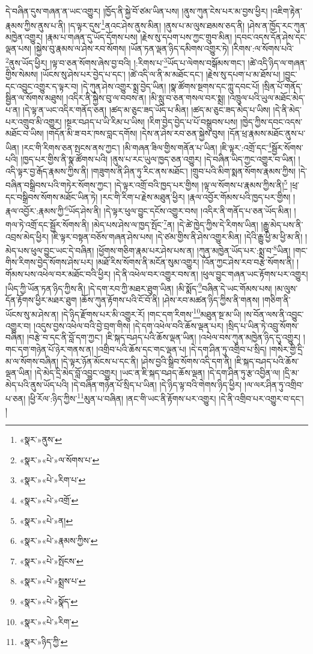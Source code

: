 དེ་བཞིན་དུས་གཞན་ན་ཡང་འགྱུར། །ཁྱོད་ནི་སྐྱེ་བོ་ཙམ་ཡིན་པས། །ནུས་ཀུན་ངེས་པར་མ་བྱས་ཕྱིར། །འཇིག་རྟེན་རྣམས་ཀྱིས་ནུས་པ་ནི། །ད་ལྟར་དུས་\footnote{«སྣར་»ནུས་}ནའང་ཤེས་ནུས་མིན། །ནུས་པ་མ་ལུས་ཐམས་ཅད་ནི། །ཤེས་ན་ཁྱོད་རང་ཀུན་མཁྱེན་འགྱུར། །རྣམ་པ་གཞན་དུ་ཡོད་དོགས་པས། །རྗེས་སུ་དཔག་པས་ཀྱང་གྲུབ་མིན། །དབང་འདས་དོན་ཤེས་དང་ལྡན་པས། །སྐྱེས་བུ་རྣམས་ལ་ཤེས་རབ་སོགས། །ཡོན་ཏན་ལྡན་ཉིད་དམིགས་འགྱུར་ཏེ། །རིགས་:ལ་སོགས་པའི་\footnote{«སྣར་»«པེ་»ལ་སོགས་པ་}ནུས་ཡོད་ཕྱིར། །ལྟ་བ་ཅན་སོགས་ཞེས་བྱ་བའི། །:རིགས་པ་\footnote{«སྣར་»«པེ་»རིག་པ་}ཡོད་པ་ལེགས་བསྒོམས་གང་། །ཚེ་འདི་ཉིད་ལ་གཞན་གྱིས་སེམས། །ཡོངས་སུ་ཤེས་པར་བྱེད་པ་དང་། །ཚེ་འདི་ལ་ནི་མ་མཐོང་དང་། །རྗེས་སུ་དཔག་པ་མ་ཐོས་པ། །བྱུང་དང་འབྱུང་འགྱུར་ད་ལྟར་བ། །དེ་ཀུན་ཤེས་འགྱུར་སྨྲ་བྱེད་ཡིན། །སྣ་ཚོགས་སྔགས་དང་ཀླུ་དབང་པོ། །སྲིན་པོ་གནོད་སྦྱིན་ལ་སོགས་མཐུས། །འདིར་ནི་སྐྱེས་བུ་ལ་བབས་ན། །མི་སླུ་བ་ཅན་གསལ་བར་སྨྲ། །འཁྲུལ་པའི་ཡུལ་མཐོང་མེད་པ་ན། །དེ་ལྟ་ན་ཡང་འདིར་གནོད་ཅན། །ཚད་མ་ཅུང་ཟད་ཡོད་པ་མིན། །ཚད་མ་ཅུང་ཟད་མེད་པ་ཡིས། །དེ་ནི་མེད་པར་འགྲུབ་མི་འགྱུར། །སྔར་བཤད་པ་ཡི་རིམ་པ་ཡིས། །རིག་བྱེད་བྱེད་པ་པོ་བསྒྲུབས་པས། །ཁྱེད་ཀྱིས་དབང་འདས་མཐོང་བ་ཡིས། །གདོན་མི་ཟ་བར་ཁས་བླང་དགོས། །དེས་ན་ཤེས་རབ་ཅན་སྐྱེས་བུས། །དོན་ཕྲ་རྣམས་མཐོང་ནུས་པ་ཡིན། །རང་གི་རིགས་ཅན་སྤངས་ནས་ཀྱང་། །མི་གཞན་ཟིལ་གྱིས་གནོན་པ་ཡིན། །ཇི་ལྟར་:འགྲོ་དང་\footnote{«སྣར་»«པེ་»འགྲོ་}སྦྱོར་སོགས་པའི། །ཁྱད་པར་གྱིས་ནི་སྣ་ཚོགས་པའི། །ནུས་པ་རང་ཡུལ་ཁྱད་ཅན་འགྱུར། །དེ་བཞིན་ཡིད་ཀྱང་འགྱུར་བ་ཡིན། །འདི་ལྟར་བྱ་རྒོད་རྣམས་ཀྱིས་ནི། །གཟུགས་ནི་ཤིན་ཏུ་རིང་ནས་མཐོང་། །གྲུབ་པའི་མིག་སྨན་སོགས་རྣམས་ཀྱིས། །དེ་བཞིན་བསྒྲིབས་པའི་གཏེར་སོགས་ཀྱང་། །དེ་ལྟར་འགྲོ་བའི་ཁྱད་པར་གྱིས། །ལྟ་ལ་སོགས་པ་རྣམས་ཀྱིས་ནི།\footnote{«སྣར་»«པེ་»ན།} །ཕྲ་དང་བསྒྲིབས་སོགས་མཐོང་ཡིན་ཏེ། །རང་གི་རིག་པ་རྗེས་མཐུན་ཕྱིར། །རྣལ་འབྱོར་གོམས་པའི་ཁྱད་པར་གྱིས། །
རྣལ་འབྱོར་:རྣམས་ཀྱི་\footnote{«སྣར་»«པེ་»རྣམས་ཀྱིས་}ཡོད་ཤེས་ནི། །དེ་ལྟར་ཕུལ་བྱུང་དངོས་འགྱུར་བས། །འདིར་ནི་གནོད་པ་ཅན་ཡོད་མིན། །གལ་ཏེ་འགྲོ་དང་སྦྱོར་སོགས་ནི། །མེད་པས་ཤེས་ལ་ཁྱད་སྤོང་\footnote{«སྣར་»«པེ་»སྤོངས་}ན། །དེ་ཚེ་ཁྱེད་ཀྱིས་དེ་རིགས་ཡིན། །རྒྱུ་མེད་པས་ནི་འབྲས་མེད་ཕྱིར། །ཇི་ལྟར་བསྟན་བཅོས་གཞན་ཤེས་པས། །དེ་ཙམ་གྱིས་ནི་ཤེས་འགྱུར་མིན། །དེའི་རྒྱུ་ཕྱི་མ་ཕྱི་མ་ནི། །མེད་པས་ཕུལ་བྱུང་ཡང་དེ་བཞིན། །ཕྱོགས་གཅིག་རྣམ་པར་ཤེས་པས་ན། །ཀུན་མཁྱེན་ཡོད་པར་:སྨྲ་བ་\footnote{«སྣར་»«པེ་»སྨྲས་པ་}ཡིན། །གང་གིས་རིགས་བྱེད་སོགས་ཤེས་པར། །མཐོ་རིས་སོགས་ནི་མངོན་སུམ་འགྱུར། །འོན་ཀྱང་ཤེས་རབ་བརྩེ་སོགས་ནི། །གོམས་པས་འཕེལ་བར་མཐོང་བའི་ཕྱིར། །དེ་ནི་འཕེལ་བར་འགྱུར་བས་ན། །ཕུལ་བྱུང་གཞན་ཡང་རྟོགས་པར་འགྱུར། །ཡིད་ཀྱི་ཡོན་ཏན་ཉིད་ཀྱིས་ནི། །དེ་དག་རབ་ཀྱི་མཐར་ཐུག་ཡིན། །མི་སྨོད་\footnote{«སྣར་»«པེ་»སྣོད་}བཞིན་དེ་ཡང་གོམས་པས། །མ་ལུས་དོན་རྟོགས་ཕྱིར་མཐར་ཐུག །ཆོས་ཀུན་རྟོགས་པའི་ངོ་བོ་ནི། །ཤེས་རབ་མཚན་ཉིད་ཀྱིས་ནི་གནས། །གཅིག་ནི་ཡོངས་སུ་མ་ཤེས་ན། །དེ་ཉིད་རྫོགས་པར་མི་འགྱུར་རོ། །གང་དག་རིགས་\footnote{«སྣར་»«པེ་»རིག་}མཐུན་སྔ་མ་ཡི། །ས་བོན་ལས་ནི་འབྱུང་འགྱུར་བ། །འདུས་བྱས་འཕེལ་བའི་བྱེ་བྲག་གིས། །དེ་དག་འཕེལ་བའི་ཆོས་ལྡན་པར། །སྲིད་པ་ཡིན་ཏེ་འབྲུ་སོགས་བཞིན། །བརྩེ་བ་དང་ནི་བློ་དག་ཀྱང་། །ཇི་སྐད་བཤད་པའི་ཆོས་ལྡན་ཡིན། །འཕེལ་བས་ཀུན་མཁྱེན་ཉིད་དུ་འགྱུར། །གང་དག་གཉེན་པོ་ཉེར་གནས་ན། །འགྲིབ་པའི་ཆོས་དང་གང་ལྡན་པ། །དེ་དག་ཤིན་ཏུ་འགྲིབ་པ་སྲིད། །གསེར་གྱི་དྲི་མ་ལ་སོགས་བཞིན། །དེ་ལྟར་ཉོན་མོངས་པ་དང་ནི། །ཤེས་བྱའི་སྒྲིབ་སོགས་འདི་དག་ནི། །ཇི་སྐད་བཤད་པའི་ཆོས་ལྡན་ཡིན། །དེ་མེད་དྲི་མེད་བློ་འབྱུང་འགྱུར། །ཡང་ན་ཇི་སྐད་བཤད་ཆོས་ལྡན། །དེ་དག་ཤིན་ཏུ་རྩ་འབྱིན་ལ། །དྲི་མ་མེད་པའི་ནུས་ཡོད་པའི། །དེ་བཞིན་གཉེན་པོ་སྲིད་པ་ཡིན། །དེ་ཉིད་ལྟ་བའི་གེགས་ཉིད་ཕྱིར། །ལ་ལར་ཤིན་ཏུ་འགྲིབ་པ་ཅན། །ཕྱི་རོལ་:ཉིད་ཀྱིས་\footnote{«སྣར་»ཉིད་ཀྱི་}མུན་པ་བཞིན། །ནང་གི་ཡང་ནི་རྟོགས་པར་འགྱུར། །དེ་ནི་འགྲིབ་པར་འགྱུར་བ་དང་། །
